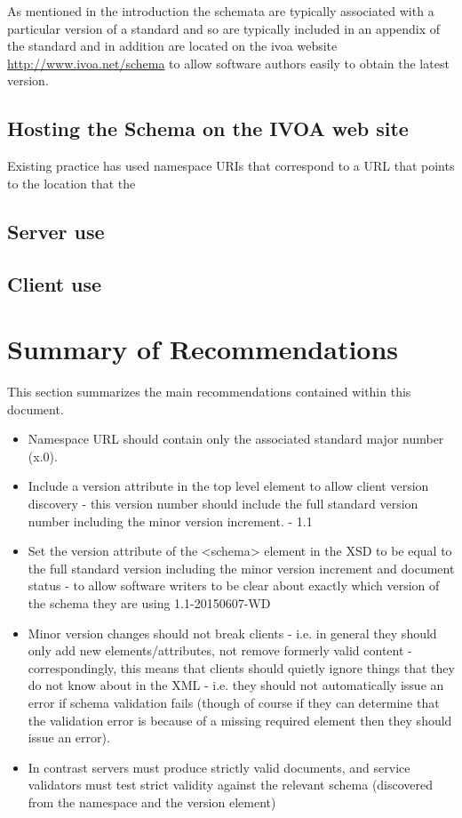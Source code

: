 \documentclass[11pt,a4paper]{ivoa}
\begin{document}
As mentioned in the introduction the schemata are typically associated with a
particular version of a standard and so are typically included in an appendix of
the standard and in addition are located on the ivoa website
\url{http://www.ivoa.net/schema} to allow software authors easily to obtain the
latest version.
\subsection{Hosting the Schema on the IVOA web site}
Existing practice has used namespace URIs that correspond to a URL that points
to the location that the 




\subsection{Server use}


\subsection{Client use}
\subsection{}
\section{Summary of Recommendations}
This section summarizes the main recommendations contained within this document.

\begin{itemize}
\item Namespace URL should contain only the associated standard major number
(x.0).

\item Include a version attribute in the top level element to allow client
version discovery - this version number should include the full standard version
number including the minor version increment. - 1.1

\item Set the version attribute of the <schema> element in the XSD to be equal
to the full standard version including the minor version increment and document status - to
allow software writers to be clear about exactly which version of the schema
they are using 1.1-20150607-WD

\item Minor version changes should not break clients - i.e. in general they
should only add new elements/attributes, not remove formerly valid content -
correspondingly, this means that clients should quietly ignore things that they
do not know about in the XML - i.e. they should not automatically issue an error
if schema validation fails (though of course if they can determine that the
validation error is because of a missing required element then they should
issue an error).
\item In contrast servers must produce strictly valid documents, and service
validators must test strict validity against the relevant schema (discovered
from the namespace and the version element)
\end{itemize}
\end{document}
